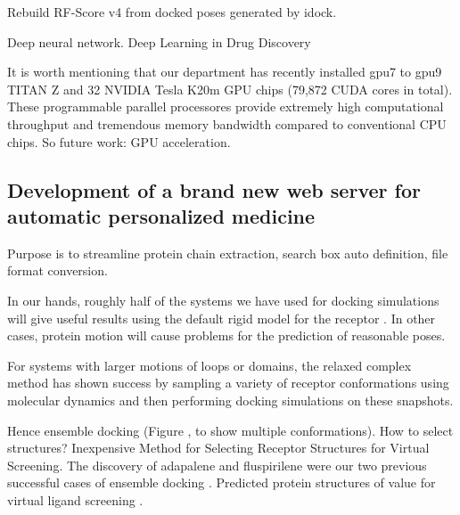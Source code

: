 \documentclass[a4paper,12pt]{article}
\begin{document}
Rebuild RF-Score v4 \citep{1795} from docked poses generated by idock.

Deep neural network. Deep Learning in Drug Discovery \citep{1810}

It is worth mentioning that our department has recently installed gpu7 to gpu9 TITAN Z and 32 NVIDIA Tesla K20m GPU chips (79,872 CUDA cores in total). These programmable parallel processores provide extremely high computational throughput and tremendous memory bandwidth compared to conventional CPU chips. So future work: GPU acceleration.





\subsection*{Development of a brand new web server for automatic personalized medicine}

Purpose is to streamline protein chain extraction, search box auto definition, file format conversion.

In our hands, roughly half of the systems we have used for docking simulations will give useful results using the default rigid model for the receptor \citep{1730}. In other cases, protein motion will cause problems for the prediction of reasonable poses. 

For systems with larger motions of loops or domains, the relaxed complex method \citep{26} has shown success by sampling a variety of receptor conformations using molecular dynamics and then performing docking simulations on these snapshots.

Hence ensemble docking (Figure , to show multiple conformations). How to select structures? \citep{1704} Inexpensive Method for Selecting Receptor Structures for Virtual Screening. The discovery of adapalene and fluspirilene were our two previous successful cases of ensemble docking \citep{1667,1681}. Predicted protein structures of value for virtual ligand screening \citep{1322,1277}.
\end{document}
